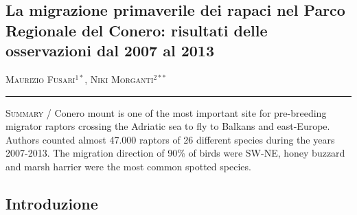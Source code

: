 \setcounter{figure}{0}
\setcounter{table}{0}

\begin{adjustwidth}{-3.5cm}{0cm}
\pagestyle{CIOpage}
\chapter*[Migrazione dei rapaci nel Parco del Conero dal 2007 al 2013]{La migrazione primaverile dei rapaci nel Parco Regionale del
Conero: risultati delle osservazioni dal 2007 al 2013}

\textsc{Maurizio Fusari}$^{1*}$, \textsc{Niki Morganti}$^{2**}$ \\

 
\noindent\color{MUSEBLUE}\rule{27cm}{2pt}
\vspace{1cm}
\end{adjustwidth}


{\small
\noindent \textsc{\color{MUSEBLUE} Summary} / Conero mount is one of the most important site for pre-breeding migrator
raptors crossing the Adriatic sea to fly to Balkans and east-Europe.
Authors counted almost 47.000 raptors of 26 different species during
the years 2007-2013. The migration direction of 90\% of birds were
SW-NE, honey buzzard and marsh harrier were the most common spotted
species.
}



\section*{Introduzione}

